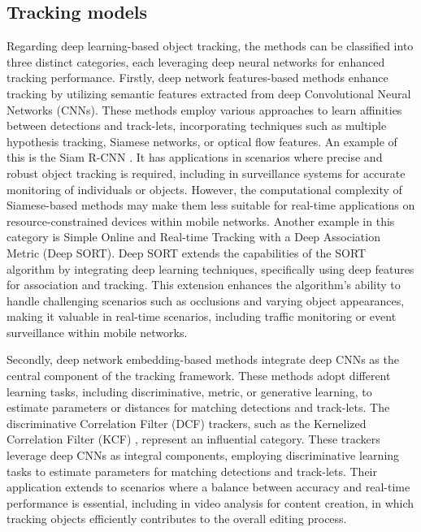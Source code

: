 \subsection{Tracking models}\label{sec:track}

Regarding deep learning-based object tracking, the methods can be classified into three distinct categories, each leveraging deep neural networks for enhanced tracking performance. Firstly, deep network features-based methods enhance tracking by utilizing semantic features extracted from deep Convolutional Neural Networks (CNNs). These methods employ various approaches to learn affinities between detections and track-lets, incorporating techniques such as multiple hypothesis tracking, Siamese networks, or optical flow features. An example of this is the Siam R-CNN \cite{siam}. It has applications in scenarios where precise and robust object tracking is required, including in surveillance systems for accurate monitoring of individuals or objects. However, the computational complexity of Siamese-based methods may make them less suitable for real-time applications on resource-constrained devices within mobile networks. Another example in this category is Simple Online and Real-time Tracking with a Deep Association Metric (Deep SORT)\cite{DeepSORT}. Deep SORT extends the capabilities of the SORT algorithm \cite{SORT} by integrating deep learning techniques, specifically using deep features for association and tracking. This extension enhances the algorithm's ability to handle challenging scenarios such as occlusions and varying object appearances, making it valuable in real-time scenarios, including traffic monitoring or event surveillance within mobile networks.

Secondly, deep network embedding-based methods integrate deep CNNs as the central component of the tracking framework. These methods adopt different learning tasks, including discriminative, metric, or generative learning, to estimate parameters or distances for matching detections and track-lets. The discriminative Correlation Filter (DCF) trackers, such as the Kernelized Correlation Filter (KCF) \cite{KCF}, represent an influential category. These trackers leverage deep CNNs as integral components, employing discriminative learning tasks to estimate parameters for matching detections and track-lets. Their application extends to scenarios where a balance between accuracy and real-time performance is essential, including in video analysis for content creation, in which tracking objects efficiently contributes to the overall editing process.

